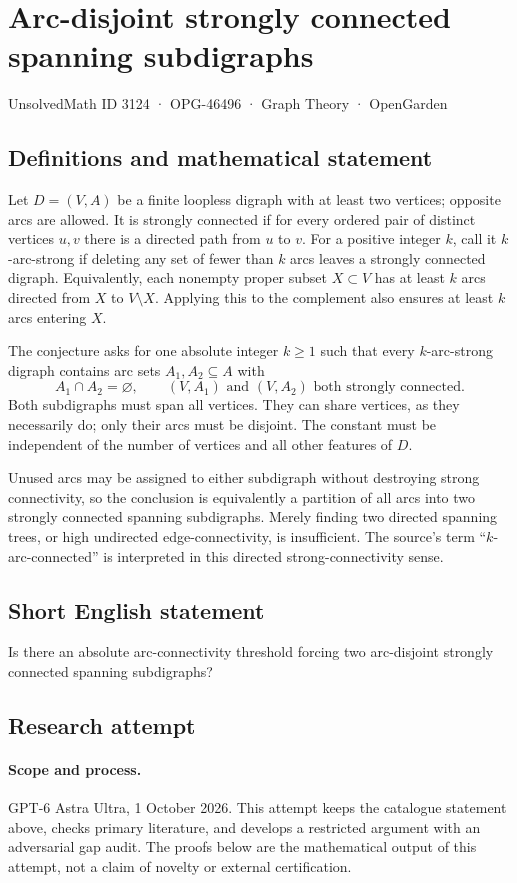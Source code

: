 \documentclass[11pt,a4paper]{article}
\begin{document}
\section*{Arc-disjoint strongly connected spanning subdigraphs}\label{3124}
{\small UnsolvedMath ID 3124 · OPG-46496 · Graph Theory · OpenGarden}
\subsection{Definitions and mathematical statement}
Let $D=(V,A)$ be a finite loopless digraph with at least two vertices;
opposite arcs are allowed. It is strongly connected if for every ordered
pair of distinct vertices $u,v$ there is a directed path from $u$ to $v$.
For a positive integer $k$, call it $k$-arc-strong if deleting any set
of fewer than $k$ arcs leaves a strongly connected digraph.
Equivalently, each nonempty proper subset $X\subset V$ has at least
$k$ arcs directed from $X$ to $V\setminus X$. Applying this to the
complement also ensures at least $k$ arcs entering $X$.

The conjecture asks for one absolute integer $k\ge1$ such that every
$k$-arc-strong digraph contains arc sets $A_1,A_2\subseteq A$ with
\[
 A_1\cap A_2=\varnothing,\qquad
 (V,A_1)\text{ and }(V,A_2)\text{ both strongly connected}.
\]
Both subdigraphs must span all vertices. They can share vertices, as
they necessarily do; only their arcs must be disjoint. The constant
must be independent of the number of vertices and all other features
of $D$.

Unused arcs may be assigned to either subdigraph without destroying
strong connectivity, so the conclusion is equivalently a partition of
all arcs into two strongly connected spanning subdigraphs. Merely finding
two directed spanning trees, or high undirected edge-connectivity, is
insufficient. The source's term ``$k$-arc-connected'' is interpreted in
this directed strong-connectivity sense.
\subsection{Short English statement}
Is there an absolute arc-connectivity threshold forcing two arc-disjoint strongly connected spanning subdigraphs?
\subsection{Research attempt}
\paragraph{Scope and process.}
GPT-6 Astra Ultra, 1 October 2026. This attempt keeps the catalogue statement above, checks primary literature, and develops a restricted argument with an adversarial gap audit. The proofs below are the mathematical output of this attempt, not a claim of novelty or external certification.
\end{document}
